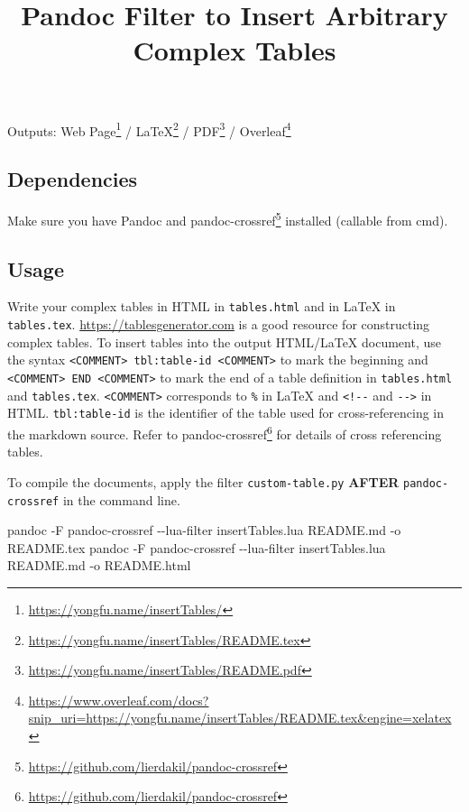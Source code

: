 \documentclass[
]{article}
\title{Pandoc Filter to Insert Arbitrary Complex Tables}
\author{}
\date{}
\newenvironment{Shaded}{}{}
\newcommand{\AttributeTok}[1]{\textcolor[rgb]{0.49,0.56,0.16}{#1}}
\newcommand{\ExtensionTok}[1]{#1}
\newcommand{\NormalTok}[1]{#1}
\DeclareRobustCommand{\href}[2]{#2\footnote{\url{#1}}}
\begin{document}
\maketitle

Outputs: \href{https://yongfu.name/insertTables/}{Web Page} /
\href{https://yongfu.name/insertTables/README.tex}{LaTeX} /
\href{https://yongfu.name/insertTables/README.pdf}{PDF} /
\href{https://www.overleaf.com/docs?snip_uri=https://yongfu.name/insertTables/README.tex\&engine=xelatex}{Overleaf}

\hypertarget{dependencies}{%
\subsection{Dependencies}\label{dependencies}}

Make sure you have Pandoc and
\href{https://github.com/lierdakil/pandoc-crossref}{pandoc-crossref}
installed (callable from cmd).

\hypertarget{usage}{%
\subsection{Usage}\label{usage}}

Write your complex tables in HTML in \texttt{tables.html} and in LaTeX
in \texttt{tables.tex}. \url{https://tablesgenerator.com} is a good
resource for constructing complex tables. To insert tables into the
output HTML/LaTeX document, use the syntax
\texttt{\textless{}COMMENT\textgreater{}\ tbl:table-id\ \textless{}COMMENT\textgreater{}}
to mark the beginning and
\texttt{\textless{}COMMENT\textgreater{}\ END\ \textless{}COMMENT\textgreater{}}
to mark the end of a table definition in \texttt{tables.html} and
\texttt{tables.tex}. \texttt{\textless{}COMMENT\textgreater{}}
corresponds to \texttt{\%} in LaTeX and \texttt{\textless{}!-\/-} and
\texttt{-\/-\textgreater{}} in HTML. \texttt{tbl:table-id} is the
identifier of the table used for cross-referencing in the markdown
source. Refer to
\href{https://github.com/lierdakil/pandoc-crossref}{pandoc-crossref} for
details of cross referencing tables.

To compile the documents, apply the filter \texttt{custom-table.py}
\textbf{AFTER} \texttt{pandoc-crossref} in the command line.

\begin{Shaded}
\begin{Highlighting}[]
\ExtensionTok{pandoc} \AttributeTok{{-}F}\NormalTok{ pandoc{-}crossref }\AttributeTok{{-}{-}lua{-}filter}\NormalTok{ insertTables.lua README.md }\AttributeTok{{-}o}\NormalTok{ README.tex}
\ExtensionTok{pandoc} \AttributeTok{{-}F}\NormalTok{ pandoc{-}crossref }\AttributeTok{{-}{-}lua{-}filter}\NormalTok{ insertTables.lua README.md }\AttributeTok{{-}o}\NormalTok{ README.html}
\end{Highlighting}
\end{Shaded}
\end{document}
